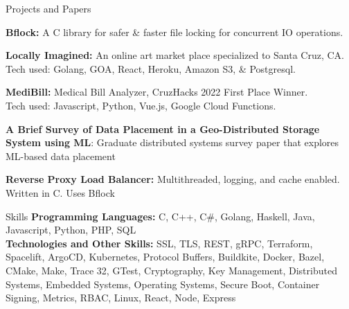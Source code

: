 \documentclass{resume} %
\begin{document}
\begin{rSection}{Projects and Papers}

    {\textbf{Bflock:}} A C library for safer \& faster file locking for concurrent IO operations.

    {\textbf{Locally Imagined:}} An online art market place specialized to Santa Cruz, CA.
    \\ Tech used: Golang, GOA, React, Heroku, Amazon S3, \& Postgresql.
    
    {\textbf{MediBill:}} Medical Bill Analyzer, CruzHacks 2022 First Place Winner.
    \\Tech used: Javascript, Python, Vue.js, Google Cloud Functions.

    {\textbf{A Brief Survey of Data Placement in a Geo-Distributed Storage System using ML}: Graduate distributed systems survey paper that explores ML-based data placement} 

    {\textbf{Reverse Proxy Load Balancer:} } Multithreaded, logging, and cache enabled. Written in C. Uses Bflock
\end{rSection}

\begin{rSection}{Skills}
    {\textbf{Programming Languages:} } C, C++, C\#, Golang, Haskell, Java, Javascript, Python, PHP, SQL
    \\{\textbf{Technologies and Other Skills:} }
    SSL, TLS, REST, gRPC, Terraform, Spacelift, ArgoCD, Kubernetes, Protocol Buffers, Buildkite, Docker,
    Bazel, CMake, Make, Trace 32, GTest, Cryptography, Key Management, Distributed Systems, Embedded Systems, Operating Systems,
    Secure Boot, Container Signing, Metrics, RBAC, Linux, React, Node, Express
\end{rSection}
    
\end{document}
